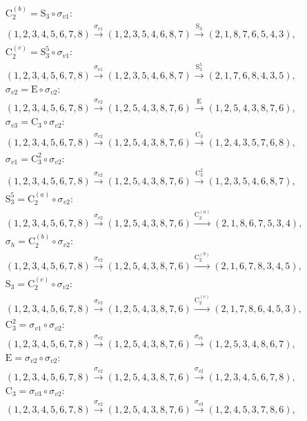 \begin{align*}
& \mathrm{C}_{2}^{(b)} = \mathrm{S}_{3} \circ \sigma_{v1}:\; \\& (1,2,3,4,5,6,7,8) \xrightarrow{\sigma_{v1}} (1,2,3,5,4,6,8,7) \xrightarrow{\mathrm{S}_{3}} (2,1,8,7,6,5,4,3), \\
& \mathrm{C}_{2}^{(c)} = \mathrm{S}_{3}^{5} \circ \sigma_{v1}:\; \\& (1,2,3,4,5,6,7,8) \xrightarrow{\sigma_{v1}} (1,2,3,5,4,6,8,7) \xrightarrow{\mathrm{S}_{3}^{5}} (2,1,7,6,8,4,3,5), \\
& \sigma_{v2} = \mathrm{E} \circ \sigma_{v2}:\; \\& (1,2,3,4,5,6,7,8) \xrightarrow{\sigma_{v2}} (1,2,5,4,3,8,7,6) \xrightarrow{\mathrm{E}} (1,2,5,4,3,8,7,6), \\
& \sigma_{v3} = \mathrm{C}_{3} \circ \sigma_{v2}:\; \\& (1,2,3,4,5,6,7,8) \xrightarrow{\sigma_{v2}} (1,2,5,4,3,8,7,6) \xrightarrow{\mathrm{C}_{3}} (1,2,4,3,5,7,6,8), \\
& \sigma_{v1} = \mathrm{C}_{3}^{2} \circ \sigma_{v2}:\; \\& (1,2,3,4,5,6,7,8) \xrightarrow{\sigma_{v2}} (1,2,5,4,3,8,7,6) \xrightarrow{\mathrm{C}_{3}^{2}} (1,2,3,5,4,6,8,7), \\
& \mathrm{S}_{3}^{5} = \mathrm{C}_{2}^{(a)} \circ \sigma_{v2}:\; \\& (1,2,3,4,5,6,7,8) \xrightarrow{\sigma_{v2}} (1,2,5,4,3,8,7,6) \xrightarrow{\mathrm{C}_{2}^{(a)}} (2,1,8,6,7,5,3,4), \\
& \sigma_{h} = \mathrm{C}_{2}^{(b)} \circ \sigma_{v2}:\; \\& (1,2,3,4,5,6,7,8) \xrightarrow{\sigma_{v2}} (1,2,5,4,3,8,7,6) \xrightarrow{\mathrm{C}_{2}^{(b)}} (2,1,6,7,8,3,4,5), \\
& \mathrm{S}_{3} = \mathrm{C}_{2}^{(c)} \circ \sigma_{v2}:\; \\& (1,2,3,4,5,6,7,8) \xrightarrow{\sigma_{v2}} (1,2,5,4,3,8,7,6) \xrightarrow{\mathrm{C}_{2}^{(c)}} (2,1,7,8,6,4,5,3), \\
& \mathrm{C}_{3}^{2} = \sigma_{v1} \circ \sigma_{v2}:\; \\& (1,2,3,4,5,6,7,8) \xrightarrow{\sigma_{v2}} (1,2,5,4,3,8,7,6) \xrightarrow{\sigma_{v1}} (1,2,5,3,4,8,6,7), \\
& \mathrm{E} = \sigma_{v2} \circ \sigma_{v2}:\; \\& (1,2,3,4,5,6,7,8) \xrightarrow{\sigma_{v2}} (1,2,5,4,3,8,7,6) \xrightarrow{\sigma_{v2}} (1,2,3,4,5,6,7,8), \\
& \mathrm{C}_{3} = \sigma_{v3} \circ \sigma_{v2}:\; \\& (1,2,3,4,5,6,7,8) \xrightarrow{\sigma_{v2}} (1,2,5,4,3,8,7,6) \xrightarrow{\sigma_{v3}} (1,2,4,5,3,7,8,6), \\

\end{align*}
